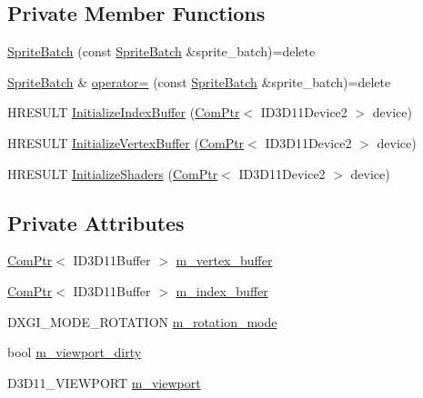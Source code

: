 \subsection*{Private Member Functions}
\begin{DoxyCompactItemize}
\item 
\hyperlink{classmage_1_1_sprite_batch_a10fe1d6cf1d2de9e087b370e7d696be8}{Sprite\+Batch} (const \hyperlink{classmage_1_1_sprite_batch}{Sprite\+Batch} \&sprite\+\_\+batch)=delete
\item 
\hyperlink{classmage_1_1_sprite_batch}{Sprite\+Batch} \& \hyperlink{classmage_1_1_sprite_batch_aa2a5df588d7589a36b38b35dc8a08a48}{operator=} (const \hyperlink{classmage_1_1_sprite_batch}{Sprite\+Batch} \&sprite\+\_\+batch)=delete
\item 
H\+R\+E\+S\+U\+LT \hyperlink{classmage_1_1_sprite_batch_ae0932c59e74e73c1644e2982932150f8}{Initialize\+Index\+Buffer} (\hyperlink{namespacemage_ae74f374780900893caa5555d1031fd79}{Com\+Ptr}$<$ I\+D3\+D11\+Device2 $>$ device)
\item 
H\+R\+E\+S\+U\+LT \hyperlink{classmage_1_1_sprite_batch_a2d489578d466293c77818d541cf18106}{Initialize\+Vertex\+Buffer} (\hyperlink{namespacemage_ae74f374780900893caa5555d1031fd79}{Com\+Ptr}$<$ I\+D3\+D11\+Device2 $>$ device)
\item 
H\+R\+E\+S\+U\+LT \hyperlink{classmage_1_1_sprite_batch_aaa79d83f88c8899e455cdc0936fce3ab}{Initialize\+Shaders} (\hyperlink{namespacemage_ae74f374780900893caa5555d1031fd79}{Com\+Ptr}$<$ I\+D3\+D11\+Device2 $>$ device)
\end{DoxyCompactItemize}
\subsection*{Private Attributes}
\begin{DoxyCompactItemize}
\item 
\hyperlink{namespacemage_ae74f374780900893caa5555d1031fd79}{Com\+Ptr}$<$ I\+D3\+D11\+Buffer $>$ \hyperlink{classmage_1_1_sprite_batch_a748eb7f2f880e32ff4cfc0b7d6156de7}{m\+\_\+vertex\+\_\+buffer}
\item 
\hyperlink{namespacemage_ae74f374780900893caa5555d1031fd79}{Com\+Ptr}$<$ I\+D3\+D11\+Buffer $>$ \hyperlink{classmage_1_1_sprite_batch_a3e0cfc2be21a137712b3670238aa91fa}{m\+\_\+index\+\_\+buffer}
\item 
D\+X\+G\+I\+\_\+\+M\+O\+D\+E\+\_\+\+R\+O\+T\+A\+T\+I\+ON \hyperlink{classmage_1_1_sprite_batch_ae062f178efe4a3af9c1573f8f8c4deee}{m\+\_\+rotation\+\_\+mode}
\item 
bool \hyperlink{classmage_1_1_sprite_batch_a36c02637431746043ed6549c9b622550}{m\+\_\+viewport\+\_\+dirty}
\item 
D3\+D11\+\_\+\+V\+I\+E\+W\+P\+O\+RT \hyperlink{classmage_1_1_sprite_batch_a3029ab1ee01ccfc69fef88eb78d5bfc0}{m\+\_\+viewport}
\end{DoxyCompactItemize}



